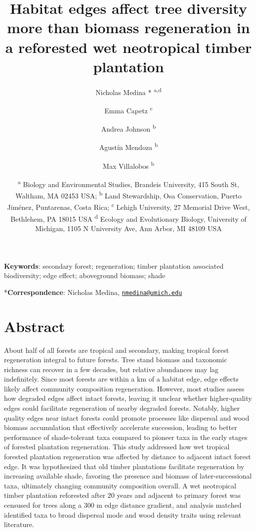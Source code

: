 \documentclass[
  12pt,
]{article}
\title{Habitat edges affect tree diversity more than biomass regeneration in a reforested wet neotropical timber plantation}
\author{Nicholas Medina * \textsuperscript{a,d} \and Emma Capetz \textsuperscript{c} \and Andrea Johnson \textsuperscript{b} \and Agustín Mendoza \textsuperscript{b} \and Max Villalobos \textsuperscript{b}}
\date{\scriptsize \textsuperscript{a} Biology and Environmental Studies, Brandeis University, 415 South St, Waltham, MA 02453 USA; \textsuperscript{b} Land Stewardship, Osa Conservation, Puerto Jiménez, Puntarenas, Costa Rica; \textsuperscript{c} Lehigh University, 27 Memorial Drive West, Bethlehem, PA 18015 USA \textsuperscript{d} Ecology and Evolutionary Biology, University of Michigan, 1105 N University Ave, Ann Arbor, MI 48109 USA}
\begin{document}
\maketitle

\hfill\break
\hfill\break

\textbf{Keywords}:
secondary forest;
regeneration;
timber plantation associated biodiversity;
edge effect;
aboveground biomass;
shade

\hfill\break
\hfill\break

*\textbf{Correspondence}: Nicholas Medina, \href{mailto:nmedina@umich.edu}{\nolinkurl{nmedina@umich.edu}}

\newpage

\hypertarget{abstract}{%
\section*{Abstract}\label{abstract}}

About half of all forests are tropical and secondary, making tropical forest regeneration integral to future forests.
Tree stand biomass and taxonomic richness can recover in a few decades, but relative abundances may lag indefinitely.
Since most forests are within a km of a habitat edge, edge effects likely affect community composition regeneration.
However, most studies assess how degraded edges affect intact forests, leaving it unclear whether higher-quality edges could facilitate regeneration of nearby degraded forests.
Notably, higher quality edges near intact forests could promote processes like dispersal and wood biomass accumulation that effectively accelerate succession, leading to better performance of shade-tolerant taxa compared to pioneer taxa in the early stages of forested plantation regeneration.
This study addressed how wet tropical forested plantation regeneration was affected by distance to adjacent intact forest edge.
It was hypothesized that old timber plantations facilitate regeneration by increasing available shade, favoring the presence and biomass of later-successional taxa, ultimately changing community composition overall.
A wet neotropical timber plantation reforested after 20 years and adjacent to primary forest was censused for trees along a 300 m edge distance gradient, and analysis matched identified taxa to broad dispersal mode and wood density traits using relevant literature.
\end{document}
